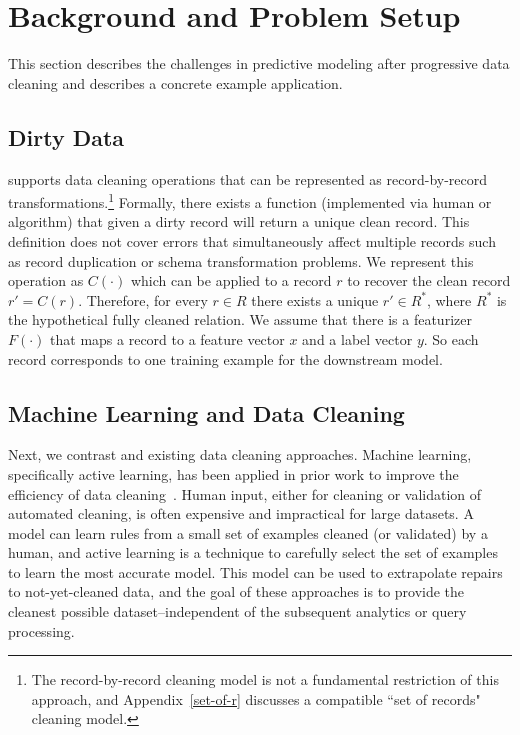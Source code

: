 \section{Background and Problem Setup}\label{background}
This section describes the challenges in predictive modeling after progressive data 
cleaning and describes a concrete example application.

\subsection{Dirty Data}\label{dmodel}
\sys supports data cleaning operations that can be represented as record-by-record transformations.\footnote{\small The record-by-record cleaning model is not a fundamental restriction of this approach, and Appendix~\ref{set-of-r} discusses a compatible ``set of records" cleaning model.}
Formally, there exists a function (implemented via human or algorithm) that given a dirty record will return a unique clean record.
This definition does not cover errors that simultaneously affect multiple records such as record duplication or schema transformation problems.
We represent this operation as $C(\cdot)$ which can be applied to a record $r$ to recover the clean record $r' = C(r)$.
Therefore, for every $r \in R$ there exists a unique $r' \in R^*$, where $R^*$ is the hypothetical fully cleaned relation.
We assume that there is a featurizer $F(\cdot)$ that maps a record to a feature vector $x$ and a label vector $y$.
So each record corresponds to one training example for the downstream model.

\subsection{Machine Learning and Data Cleaning}\label{alrw}
Next, we contrast \sys and existing data cleaning approaches.
Machine learning, specifically active learning, has been applied in prior work to improve the efficiency of data cleaning~\cite{yakout2013don,DBLP:journals/pvldb/YakoutENOI11,gokhale2014corleone}.
Human input, either for cleaning or validation of automated cleaning, is often expensive and impractical for large datasets.
A model can learn rules from a small set of examples cleaned (or validated) by a human, and active learning is a technique to carefully select the set of examples to learn the most accurate model.
This model can be used to extrapolate repairs to not-yet-cleaned data, and the goal of these approaches is to provide the cleanest possible dataset--independent of the subsequent analytics or query processing.

